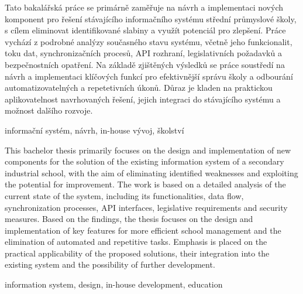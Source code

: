 \begin{abstractCZ}
    Tato bakalářská práce se primárně zaměřuje na návrh a implementaci nových komponent pro řešení stávajícího informačního systému střední průmyslové školy, s cílem eliminovat identifikované slabiny a využít potenciál pro zlepšení. Práce vychází z podrobné analýzy současného stavu systému, včetně jeho funkcionalit, toku dat, synchronizačních procesů, API rozhraní, legislativních požadavků a bezpečnostních opatření. Na základě zjištěných výsledků se práce soustředí na návrh a implementaci klíčových funkcí pro efektivnější správu školy a odbourání automatizovatelných a repetetivních úkonů. Důraz je kladen na praktickou aplikovatelnost navrhovaných řešení, jejich integraci do stávajícího systému a možnost dalšího rozvoje.
\end{abstractCZ}

\begin{keywordsCZ}
    informační systém, návrh, in-house vývoj, školství
\end{keywordsCZ}
    
    \vspace{2cm}
    
\begin{abstractEN}
    This bachelor thesis primarily focuses on the design and implementation of new components for the solution of the existing information system of a secondary industrial school, with the aim of eliminating identified weaknesses and exploiting the potential for improvement. The work is based on a detailed analysis of the current state of the system, including its functionalities, data flow, synchronization processes, API interfaces, legislative requirements and security measures. Based on the findings, the thesis focuses on the design and implementation of key features for more efficient school management and the elimination of automated and repetitive tasks. Emphasis is placed on the practical applicability of the proposed solutions, their integration into the existing system and the possibility of further development.
\end{abstractEN}
    
\begin{keywordsEN}
    information system, design, in-house development, education
\end{keywordsEN}